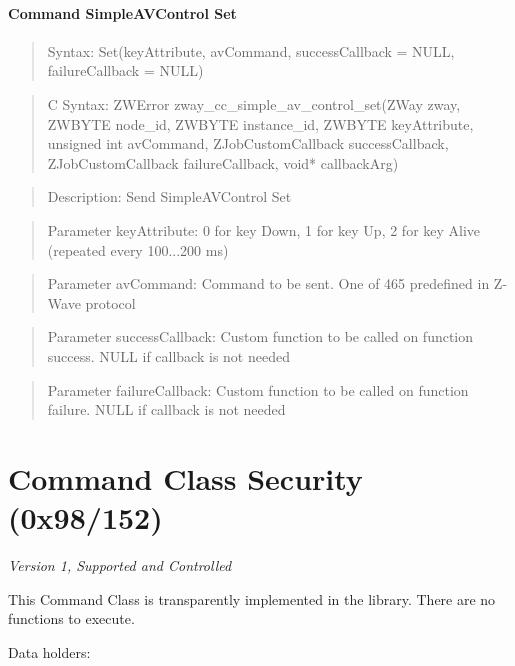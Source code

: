 \paragraph{Command SimpleAVControl Set}
\begin{quote}Syntax: Set(keyAttribute, avCommand, successCallback = NULL, failureCallback = NULL)\end{quote}
\begin{quote}C Syntax: ZWError zway\_cc\_simple\_av\_control\_set(ZWay zway, ZWBYTE node\_id, ZWBYTE instance\_id, ZWBYTE keyAttribute, unsigned int avCommand, ZJobCustomCallback successCallback, ZJobCustomCallback failureCallback, void* callbackArg)\end{quote}
\begin{quote}Description: Send SimpleAVControl Set\end{quote}
\begin{quote}Parameter keyAttribute: 0 for key Down, 1 for key Up, 2 for key Alive (repeated every 100...200 ms)\end{quote}
\begin{quote}Parameter avCommand: Command to be sent. One of 465 predefined in Z-Wave protocol\end{quote}
\begin{quote}Parameter successCallback: Custom function to be called on function success. NULL if callback is not needed\end{quote}
\begin{quote}Parameter failureCallback: Custom function to be called on function failure. NULL if callback is not needed\end{quote}



\section{Command Class Security (0x98/152)}

\textit{Version 1, Supported and Controlled}
\newline

This Command Class is transparently implemented in the library. There are no functions to execute.
\newline

\noindent
Data holders:

